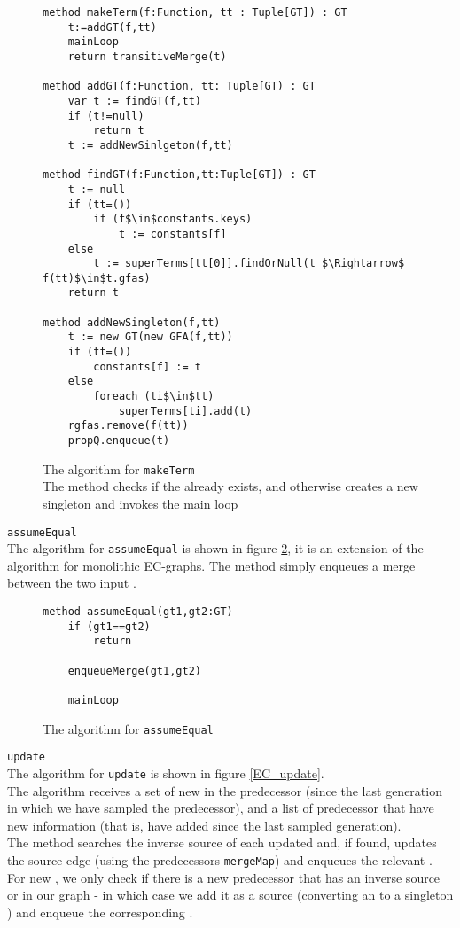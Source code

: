 \begin{figure}
\begin{lstlisting}
method makeTerm(f:Function, tt : Tuple[GT]) : GT
	t:=addGT(f,tt)
	mainLoop
	return transitiveMerge(t)
	
method addGT(f:Function, tt: Tuple[GT) : GT
	var t := findGT(f,tt)
	if (t!=null)
		return t
	t := addNewSinlgeton(f,tt)

method findGT(f:Function,tt:Tuple[GT]) : GT
	t := null
	if (tt=())
		if (f$\in$constants.keys)
			t := constants[f]
	else
		t := superTerms[tt[0]].findOrNull(t $\Rightarrow$ f(tt)$\in$t.gfas)
	return t
	
method addNewSingleton(f,tt)
	t := new GT(new GFA(f,tt))
	if (tt=())
		constants[f] := t
	else
		foreach (ti$\in$tt)
			superTerms[ti].add(t)
	rgfas.remove(f(tt))
	propQ.enqueue(t)
\end{lstlisting}
\caption{The algorithm for \lstinline|makeTerm|\\
The method checks if the \GFA{} already exists, 
and otherwise creates a new singleton \GT{} and invokes the main loop
}
\label{EC_makeTerm}
\end{figure}

\bigskip
\noindent
\lstinline|assumeEqual|\\
The algorithm for  \lstinline|assumeEqual| is shown in figure \ref{EC_assumeEqual}, it is an extension of the algorithm for monolithic EC-graphs. The method simply enqueues a merge between the two input \GTs{}.

\begin{figure}
\begin{lstlisting}
method assumeEqual(gt1,gt2:GT)
	if (gt1==gt2)
		return
		
	enqueueMerge(gt1,gt2)
	
	mainLoop
\end{lstlisting}
\caption{The algorithm for \lstinline|assumeEqual|\\
}
\label{EC_assumeEqual}
\end{figure}

\bigskip

\noindent
\lstinline|update|\\
The algorithm for \lstinline|update| is shown in figure \ref{EC_update}.\\
The algorithm receives a set of new \GTs{} in the predecessor (since the last generation in which we have sampled the predecessor), and a list of predecessor \GTs{} that have new information (that is, have added \GFAs{} since the last sampled generation).\\
The method searches the inverse source of each updated \GT{} and, if found, updates the source edge (using the predecessors \lstinline|mergeMap|) and enqueues the relevant \GT{}.\\
For new \GTs{}, we only check if there is a new predecessor \GT{} that has an inverse source \GFA{} or \RGFA{} in our graph - in which case we add it as a source (converting an \RGFA{} to a singleton \GT{}) and enqueue the corresponding \GT{}.

